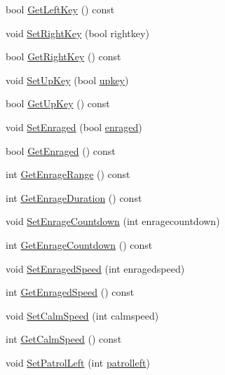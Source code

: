 \begin{DoxyCompactItemize}
\item 
bool \hyperlink{classPrincessObject_a3fd4789c53bba5edefc21dfc369684cf}{Get\+Left\+Key} () const 
\item 
void \hyperlink{classPrincessObject_a5ca1c589227ab6cd4a6ca0ad90210202}{Set\+Right\+Key} (bool rightkey)
\item 
bool \hyperlink{classPrincessObject_af17205e238755baf440cc8c7af5134ea}{Get\+Right\+Key} () const 
\item 
void \hyperlink{classPrincessObject_a68daadc8a6eba6e4c79f15816235d2f3}{Set\+Up\+Key} (bool \hyperlink{classPrincessObject_ad9b1f2960b134b902515903b9a3b5a33}{upkey})
\item 
bool \hyperlink{classPrincessObject_ac480cd27ed76aeebff8035bab8e15861}{Get\+Up\+Key} () const 
\item 
void \hyperlink{classPrincessObject_a4a2fe02f98e087541b43e1eb48fc1e88}{Set\+Enraged} (bool \hyperlink{classPrincessObject_a8fddc0f13abc747529e98638b9fd8e30}{enraged})
\item 
bool \hyperlink{classPrincessObject_ab53f64482055a704c1bd7fa9aa937333}{Get\+Enraged} () const 
\item 
int \hyperlink{classPrincessObject_a5a5ee2bb03553486a046268d196dece7}{Get\+Enrage\+Range} () const 
\item 
int \hyperlink{classPrincessObject_a36877ada317551f12c5b4750f59e5175}{Get\+Enrage\+Duration} () const 
\item 
void \hyperlink{classPrincessObject_a9e92dc9d144173e97fccead0f3ddab77}{Set\+Enrage\+Countdown} (int enragecountdown)
\item 
int \hyperlink{classPrincessObject_ab18a896d35f475e466fe1e48e8478910}{Get\+Enrage\+Countdown} () const 
\item 
void \hyperlink{classPrincessObject_a396c2481c3e7ec0b392615c99fb42aa8}{Set\+Enraged\+Speed} (int enragedspeed)
\item 
int \hyperlink{classPrincessObject_a94168f01524cb9fbefc829dc3f7bc612}{Get\+Enraged\+Speed} () const 
\item 
void \hyperlink{classPrincessObject_ae9c82f7d4512b6ef8af32cf7630a430b}{Set\+Calm\+Speed} (int calmspeed)
\item 
int \hyperlink{classPrincessObject_ad723220c44d119ff257c2a671065f67d}{Get\+Calm\+Speed} () const 
\item 
void \hyperlink{classPrincessObject_ac6811316aefb7b33748434787347bf79}{Set\+Patrol\+Left} (int \hyperlink{classPrincessObject_acd31f54e8a040a3fb3179cb016c7fd0f}{patrolleft})
\item 

\end{DoxyCompactItemize}
